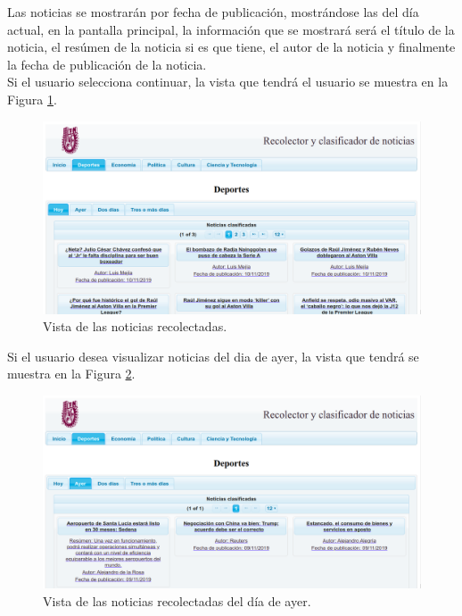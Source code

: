 Las noticias se mostrarán por fecha de publicación, mostrándose las del día actual, en la pantalla principal, la información que se mostrará será el título de la noticia, el resúmen de la noticia si es que tiene, el autor de la noticia y finalmente la fecha de publicación de la noticia.\\
Si el usuario selecciona continuar, la vista que tendrá el usuario se muestra en la Figura \ref{fig:vistaNoticias}.
\\
\begin{figure}[H]
\centering
\includegraphics[scale=0.29]{imagenes/Capitulo5/noticiasDeHoy.png}
\caption{Vista de las noticias recolectadas.}
\label{fig:vistaNoticias}
\end{figure}

Si el usuario desea visualizar noticias del dia de ayer, la vista que tendrá se muestra en la Figura \ref{fig:vistaNoticiasAyer}.
\\
\begin{figure}[H]
\centering
\includegraphics[scale=0.29]{imagenes/Capitulo5/noticiasDeAyer.png}
\caption{Vista de las noticias recolectadas del día de ayer.}
\label{fig:vistaNoticiasAyer}
\end{figure}

